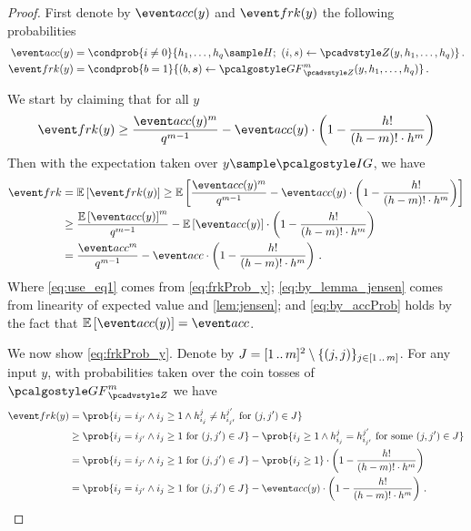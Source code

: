 \begin{proof}
First denote by $\accProb(y)$ and $\frkProb(y)$ the following probabilities
\begin{align*}
\accProb(y) & =  \condprob{i \neq 0}{h_1, \ldots, h_q \sample H;\ (i, s)
\gets \zdv(y, h_1, \ldots, h_q)}\,.\\
	\frkProb(y) & = \condprob{b = 1}{(b, \vec{s}) \gets
\genforking_{\zdv}^{m}(y, h_1, \ldots, h_q)}\,.
\end{align*}

We start by claiming that for all $y$ 
\begin{equation}\label{eq:frkProb_y}
	\frkProb(y) \geq 
	\frac{\accProb(y)^m}{q^{m - 1}} - \accProb(y) \cdot \left(1 -
  \frac{h!}{(h - m)! \cdot h^{m}}\right)
	\end{equation}
Then with the expectation taken over $y \sample \ig$, we have
\begin{align}
	\frkProb & = \expected{\frkProb(y)} \geq
	\expected{\frac{\accProb(y)^m}{q^{m - 1}} -  \accProb(y) \cdot \left(1 -
  \frac{h!}{(h - m)! \cdot h^{m}}\right)} \label{eq:use_eq1}\\
	& \geq \frac{\expected{\accProb(y)}^m}{q^{m - 1}} -
	\expected{\accProb(y)} \cdot \left(1 - \frac{h!}{(h - m)! \cdot
  h^{m}}\right) \label{eq:by_lemma_jensen}\\
	& = \frac{\accProb^m}{q^{m - 1}} -  \accProb \cdot \left(1 -
  \frac{h!}{(h - m)! \cdot h^{m}}\right)\label{eq:by_accProb}\,.
\end{align}
Where \cref{eq:use_eq1} comes from \cref{eq:frkProb_y};
\cref{eq:by_lemma_jensen} comes from linearity of expected value and \cref{lem:jensen}; and
\cref{eq:by_accProb} holds by the fact that $\expected{\accProb(y)} =
\accProb$.

We now show \cref{eq:frkProb_y}.
Denote by $J = [1 \, .. \, m]^2 \setminus \{(j, j)\}_{j \in [1 \, .. \, m]}$. 
For any input $y$, with probabilities taken over the coin tosses of
$\genforking_{\zdv}^{m}$ we have
\begin{align*}
	\frkProb (y) & = \prob{i_j = i_{j'} \land i_j \geq 1 \land
h_{i_j}^{j} \neq h_{i_{j'}}^{j'} \text{ for } (j, j') \in J}	\\
	& \geq \prob{i_j = i_{j'} \land i_j \geq 1 \text{ for } (j, j') \in J} %
   - \prob{i_j \geq 1 \land h_{i_j}^{j} = h_{i_{j'}}^{j'} \text{ for some } (j, j') \in J}\\
	& = \prob{i_j = i_{j'} \land i_j \geq 1 \text{ for } (j, j') \in J} -
	\prob{i_j \geq 1} \cdot 
  \left(1 - \frac{h!}{(h - m)! \cdot h^{m}}\right) \\ 
	& = \prob{i_j = i_{j'} \land
	i_j \geq 1 \text{ for } (j, j') \in J} - \accProb(y) \cdot \left(1 -
\frac{h!}{(h - m)! \cdot h^{m}}\right)\,.
\end{align*}


\end{proof}

